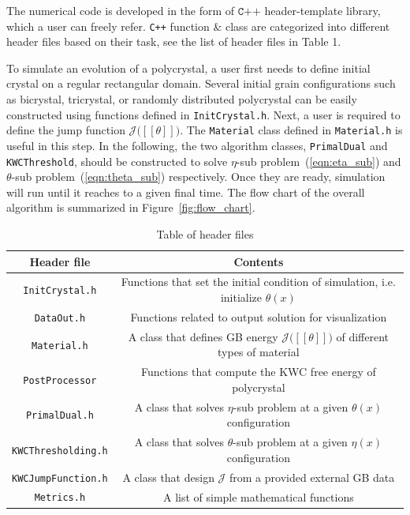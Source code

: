 \documentclass[11pt]{article}
\begin{document}
The numerical code is developed in the form of $\texttt{C++}$ header-template library,
which a user can freely refer. 
\texttt{C++} function \& class are categorized into different header
files based on their task, see the list of header files in Table 1. 

To simulate an evolution of a polycrystal, a user first needs to define 
initial crystal on a regular rectangular domain.  
Several initial grain configurations 
such as bicrystal, tricrystal, or randomly distributed polycrystal
can be easily constructed using functions defined in \texttt{InitCrystal.h}.
Next, a user is required to define the jump function $\mathcal{J}\big( [\![\theta ]\!]\big)$.
The \texttt{Material} class defined in \texttt{Material.h} is useful in this step.
In the following, the two algorithm classes, \texttt{PrimalDual} and 
\texttt{KWCThreshold}, should be constructed to
solve $\eta$-sub problem~(\ref{eqn:eta_sub}) and 
$\theta$-sub problem~(\ref{eqn:theta_sub}) respectively. 
Once they are ready, 
simulation will run until it reaches to a given final time. 
The flow chart of the overall algorithm is summarized 
in Figure~\ref{fig:flow_chart}. 

\begin{table}
\begin{center}
\begin{tabular}{cc} \toprule
Header file     & Contents \\ \midrule
\texttt{InitCrystal.h} & Functions that set the initial condition of simulation, i.e. initialize $\theta(x)$\\
\texttt{DataOut.h} & Functions related to output solution for visualization\\
\texttt{Material.h} & A class that defines GB energy $\mathcal{J}\big( [\![ \theta ]\!] \big)$ of different types of material \\
\texttt{PostProcessor} & Functions that compute the KWC free energy of polycrystal\\
\texttt{PrimalDual.h} & A class that solves $\eta$-sub problem at a given $\theta(x)$ configuration\\
\texttt{KWCThresholding.h} & A class that solves $\theta$-sub problem at a given $\eta(x)$ configuration\\
\texttt{KWCJumpFunction.h} & A class that design $\mathcal{J}$ from a provided external GB data \\
\texttt{Metrics.h} & A list of simple mathematical functions
\end{tabular}
\caption{Table of header files}
\label{tab:symbols}
\end{center}
\end{table}
\end{document}
